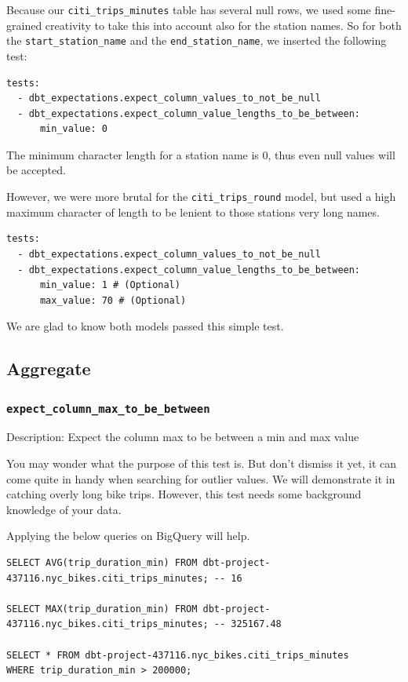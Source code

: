 \documentclass[
]{book}
\begin{document}
Because our \texttt{citi\_trips\_minutes} table has several null rows, we used some fine-grained creativity to take this into account also for the station names. So for both the \texttt{start\_station\_name} and the \texttt{end\_station\_name}, we inserted the following test:

\begin{verbatim}
tests:
  - dbt_expectations.expect_column_values_to_not_be_null
  - dbt_expectations.expect_column_value_lengths_to_be_between:
      min_value: 0
\end{verbatim}

The minimum character length for a station name is 0, thus even null values will be accepted.

However, we were more brutal for the \texttt{citi\_trips\_round} model, but used a high maximum character of length to be lenient to those stations very long names.

\begin{verbatim}
tests:
  - dbt_expectations.expect_column_values_to_not_be_null
  - dbt_expectations.expect_column_value_lengths_to_be_between:
      min_value: 1 # (Optional)
      max_value: 70 # (Optional)
\end{verbatim}

We are glad to know both models passed this simple test.

\hypertarget{aggregate}{%
\subsection{Aggregate}\label{aggregate}}

\hypertarget{expect_column_max_to_be_between}{%
\subsubsection{\texorpdfstring{\texttt{expect\_column\_max\_to\_be\_between}}{expect\_column\_max\_to\_be\_between}}\label{expect_column_max_to_be_between}}

Description: Expect the column max to be between a min and max value

You may wonder what the purpose of this test is. But don't dismiss it yet, it can come quite in handy when searching for outlier values. We will demonstrate it in catching overly long bike trips. However, this test needs some background knowledge of your data.

Applying the below queries on BigQuery will help.

\begin{verbatim}
SELECT AVG(trip_duration_min) FROM dbt-project-437116.nyc_bikes.citi_trips_minutes; -- 16

SELECT MAX(trip_duration_min) FROM dbt-project-437116.nyc_bikes.citi_trips_minutes; -- 325167.48

SELECT * FROM dbt-project-437116.nyc_bikes.citi_trips_minutes
WHERE trip_duration_min > 200000;
\end{verbatim}
\end{document}
